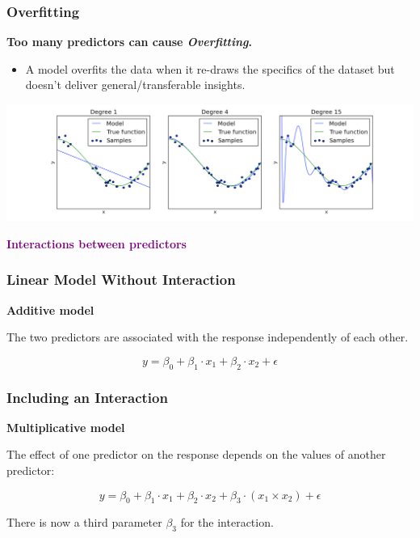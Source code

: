 \documentclass{beamer}
\begin{document}
\begin{frame}
  \frametitle{Overfitting}
  \textbf{Too many predictors can cause \textit{Overfitting}.}
  
  \begin{itemize}
    \item A model overfits the data when it re-draws the specifics of the dataset but doesn't deliver general/transferable insights.
  \end{itemize}
  
  \begin{center}
    \includegraphics[width=1\textwidth]{figures/overfitting.png} 
  \end{center}
\end{frame}

\begin{frame}{}
  \begin{center}
    \huge\textbf{\textcolor{purple}{Interactions between predictors}}
  \end{center}
\end{frame}

\begin{frame}
  \frametitle{Linear Model Without Interaction}
  \textbf{Additive model}
  
  The two predictors are associated with the response independently of each other.
  
  \begin{equation*}
    y = \beta_0 + \beta_1 \cdot x_1 + \beta_2 \cdot x_2 + \epsilon
  \end{equation*}
\end{frame}

\begin{frame}
  \frametitle{Including an Interaction}
  \textbf{Multiplicative model}
  
  The effect of one predictor on the response depends on the values of another predictor:
  
  \begin{equation*}
    y = \beta_0 + \beta_1 \cdot x_1 + \beta_2 \cdot x_2 + \beta_3 \cdot (x_1 \times x_2) + \epsilon
  \end{equation*}
  
  There is now a third parameter $\beta_3$ for the interaction.
\end{frame}
\end{document}
